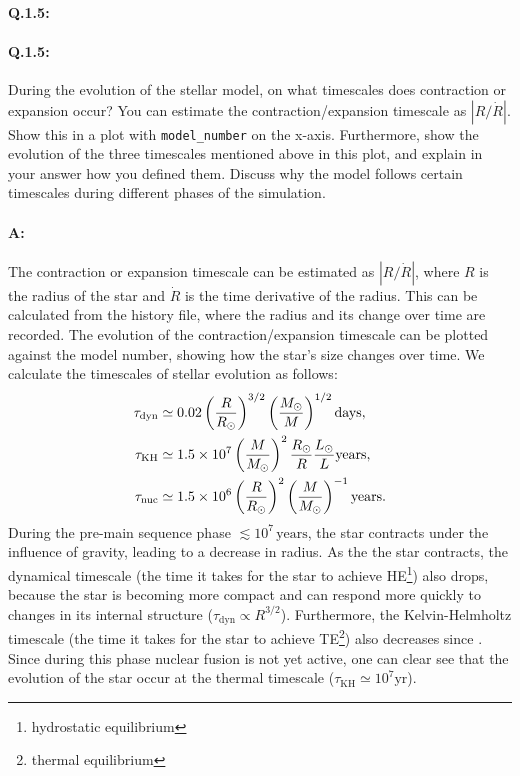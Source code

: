 \documentclass[twocolumn,fontsize=11pt]{scrartcl}
\begin{document}
\paragraph{Q.1.5:} 

\paragraph{Q.1.5:} During the evolution of the stellar model, on what timescales does contraction or expansion occur? You can estimate the contraction/expansion timescale as \(\left|R/\dot{R}\right|\). Show this in a plot with \texttt{model\_number} on the x-axis. Furthermore, show the evolution of the three timescales mentioned above in this plot, and explain in your answer how you defined them. Discuss why the model follows certain timescales during different phases of the simulation.

\paragraph{A:} The contraction or expansion timescale can be estimated as \(\left|R/\dot{R}\right|\), where \(R\) is the radius of the star and \(\dot{R}\) is the time derivative of the radius. This can be calculated from the history file, where the radius and its change over time are recorded. The evolution of the contraction/expansion timescale can be plotted against the model number, showing how the star's size changes over time. We calculate the timescales of stellar evolution as follows:
\begin{align*}
    \tau_{\text{dyn}} &\simeq 0.02 \left(\frac{R}{R_\odot}\right)^{3/2} \left(\frac{M_\odot}{M}\right)^{1/2} \text{days}, \\
    \tau_{\text{KH}} &\simeq 1.5 \times 10^7\left(\frac{M}{M_\odot}\right)^{2} \frac{R_\odot}{R}\frac{L_\odot}{L} \text{years}, \\
    \tau_{\text{nuc}} &\simeq 1.5 \times 10^6\left(\frac{R}{R_\odot}\right)^{2} \left(\frac{M}{M_\odot}\right)^{-1} \text{years}.
\end{align*}
During the pre-main sequence phase \(\lesssim 10^7\,\text{years}\), the star contracts under the influence of gravity, leading to a decrease in radius. As the the star contracts, the dynamical timescale (the time it takes for the star to achieve HE\footnote{hydrostatic equilibrium}) also drops, because the star is becoming more compact and can respond more quickly to changes in its internal structure (\(\tau_{\text{dyn}} \propto R^{3/2}\)). Furthermore, the Kelvin-Helmholtz timescale (the time it takes for the star to achieve TE\footnote{thermal equilibrium}) also decreases since . Since during this phase nuclear fusion is not yet active, one can clear see that the evolution of the star occur at the thermal timescale (\(\tau_{\text{KH}} \simeq 10^7 \text{yr}\)).
\end{document}
